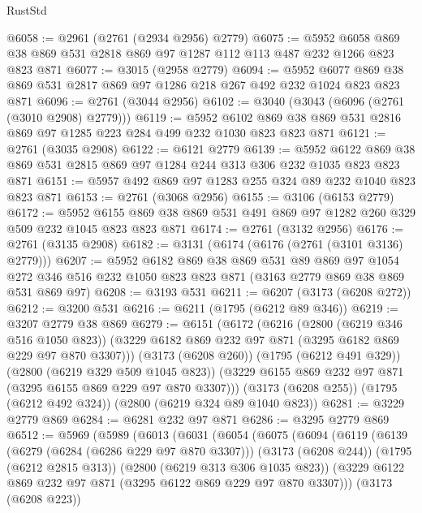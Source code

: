 \begin{lexlean}{RustStd}
\begin{coremodule}
@6058 := @2961 (@2761 (@2934 @2956) @2779)
@6075 := @5952
    @6058
    @869
    @38
    @869
    @531
    @2818
    @869
    @97
    @1287
    @112
    @113
    @487
    @232
    @1266
    @823
    @823
    @871
@6077 := @3015 (@2958 @2779)
@6094 := @5952
    @6077
    @869
    @38
    @869
    @531
    @2817
    @869
    @97
    @1286
    @218
    @267
    @492
    @232
    @1024
    @823
    @823
    @871
@6096 := @2761 (@3044 @2956)
@6102 := @3040 (@3043 (@6096 (@2761 (@3010 @2908) @2779)))
@6119 := @5952
    @6102
    @869
    @38
    @869
    @531
    @2816
    @869
    @97
    @1285
    @223
    @284
    @499
    @232
    @1030
    @823
    @823
    @871
@6121 := @2761 (@3035 @2908)
@6122 := @6121 @2779
@6139 := @5952
    @6122
    @869
    @38
    @869
    @531
    @2815
    @869
    @97
    @1284
    @244
    @313
    @306
    @232
    @1035
    @823
    @823
    @871
@6151 := @5957 @492 @869 @97 @1283 @255 @324 @89 @232 @1040 @823 @823 @871
@6153 := @2761 (@3068 @2956)
@6155 := @3106 (@6153 @2779)
@6172 := @5952 @6155 @869 @38 @869 @531 @491 @869 @97 @1282 @260 @329 @509 @232 @1045 @823 @823 @871
@6174 := @2761 (@3132 @2956)
@6176 := @2761 (@3135 @2908)
@6182 := @3131 (@6174 (@6176 (@2761 (@3101 @3136) @2779)))
@6207 := @5952
    @6182
    @869
    @38
    @869
    @531
    @89
    @869
    @97
    @1054
    @272
    @346
    @516
    @232
    @1050
    @823
    @823
    @871
    (@3163 @2779 @869 @38 @869 @531 @869 @97)
@6208 := @3193 @531
@6211 := @6207 (@3173 (@6208 @272))
@6212 := @3200 @531
@6216 := @6211 (@1795 (@6212 @89 @346))
@6219 := @3207 @2779 @38 @869
@6279 := @6151
    (@6172
      (@6216
        (@2800 (@6219 @346 @516 @1050 @823))
        (@3229 @6182 @869 @232 @97 @871 (@3295 @6182 @869 @229 @97 @870 @3307)))
      (@3173 (@6208 @260))
      (@1795 (@6212 @491 @329))
      (@2800 (@6219 @329 @509 @1045 @823))
      (@3229 @6155 @869 @232 @97 @871 (@3295 @6155 @869 @229 @97 @870 @3307)))
    (@3173 (@6208 @255))
    (@1795 (@6212 @492 @324))
    (@2800 (@6219 @324 @89 @1040 @823))
@6281 := @3229 @2779 @869
@6284 := @6281 @232 @97 @871
@6286 := @3295 @2779 @869
@6512 := @5969
    (@5989
      (@6013
        (@6031
          (@6054
            (@6075
              (@6094
                (@6119
                  (@6139
                    (@6279 (@6284 (@6286 @229 @97 @870 @3307)))
                    (@3173 (@6208 @244))
                    (@1795 (@6212 @2815 @313))
                    (@2800 (@6219 @313 @306 @1035 @823))
                    (@3229 @6122 @869 @232 @97 @871 (@3295 @6122 @869 @229 @97 @870 @3307)))
                  (@3173 (@6208 @223))

\end{coremodule}
\end{lexlean}
